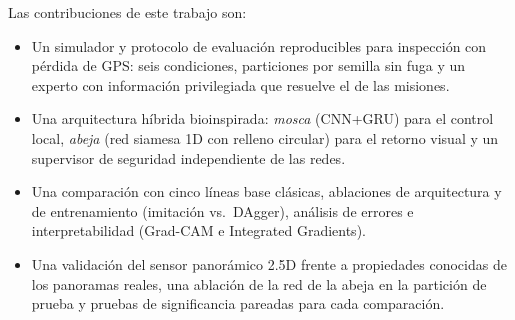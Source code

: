 Las contribuciones de este trabajo son:
\begin{itemize}
  \item Un simulador y protocolo de evaluación reproducibles para inspección con pérdida de
        GPS: seis condiciones, particiones por semilla sin fuga y un experto con información
        privilegiada que resuelve el \nfbExitoExperto{} de las misiones.
  \item Una arquitectura híbrida bioinspirada: \emph{mosca} (CNN+GRU) para el control local,
        \emph{abeja} (red siamesa 1D con relleno circular) para el retorno visual y un
        supervisor de seguridad independiente de las redes.
  \item Una comparación con cinco líneas base clásicas, ablaciones de arquitectura y de
        entrenamiento (imitación vs.\ DAgger), análisis de errores e interpretabilidad
        (Grad-CAM e Integrated Gradients).
  \item Una validación del sensor panorámico 2.5D frente a propiedades conocidas de los
        panoramas reales, una ablación de la red de la abeja en la partición de prueba y
        pruebas de significancia pareadas para cada comparación.
\end{itemize}
